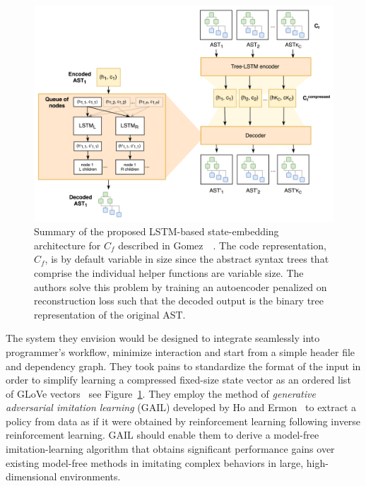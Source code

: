 
\begin{figure}
%
  \begin{center}
    \includegraphics[width=5.0in]{./figures/CS379C_Final_Project_Gomezetal_Figure_03.png}
  \end{center}
%
  \caption{Summary of the proposed LSTM-based state-embedding architecture for $C_{f}$ described in Gomez~\etal{}~\cite{CS379C_Final_Project_Gomezetal-18}. The code representation, $C_{f}$, is by default variable in size since the abstract syntax trees that comprise the individual helper functions are variable size. The authors solve this problem by training an autoencoder penalized on reconstruction loss such that the decoded output is the binary tree representation of the original AST.}
%
  \label{fig_CS379C_Final_Project_Gomezetal_Figure_03}
%
\end{figure}


The system they envision would be designed to integrate seamlessly into programmer's workflow, minimize interaction and start from a simple header file and dependency graph. They took pains to standardize the format of the input in order to simplify learning a compressed fixed-size state vector as an ordered list of GLoVe vectors~\cite{PenningtonetalEMNLP-14} \emdash{} see Figure~\ref{fig_CS379C_Final_Project_Gomezetal_Figure_03}. They employ the method of {\it{generative adversarial imitation learning}} (GAIL) developed by Ho and Ermon~\cite{HoandErmonCoRR-16} to extract a policy from data as if it were obtained by reinforcement learning following inverse reinforcement learning. GAIL should enable them to derive a model-free imitation-learning algorithm that obtains significant performance gains over existing model-free methods in imitating complex behaviors in large, high-dimensional environments.

